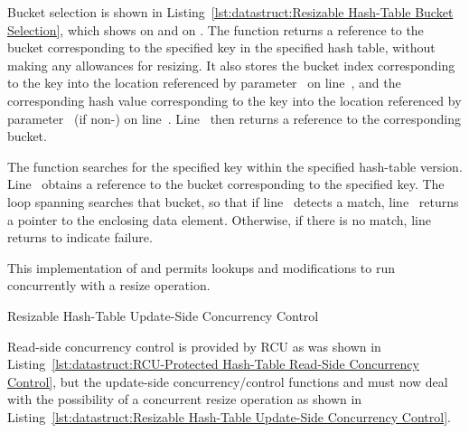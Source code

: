 \begin{fcvref}
Bucket selection is shown in
Listing~\ref{lst:datastruct:Resizable Hash-Table Bucket Selection},
which shows  on
 and  on
.
The  function returns a reference to the bucket
corresponding to the specified key in the specified hash table, without
making any allowances for resizing.
It also stores the bucket index corresponding to the key into the location
referenced by parameter~ on
line~, and the corresponding
hash value corresponding to the key into the location
referenced by parameter~ (if non-) on line~.
Line~ then returns a reference to the corresponding bucket.

The  function searches for the specified key
within the specified hash-table version.
Line~ obtains a reference to the bucket corresponding
to the specified key.
The loop spanning  searches
that bucket, so that if line~ detects a match,
line~ returns a pointer to the enclosing data element.
Otherwise, if there is no match,
line~ returns  to indicate
failure.
\end{fcvref}

\QuickQuizEnd

This implementation of  and 
permits lookups and modifications to run concurrently with a resize
operation.

\begin{listing}[tb]

\caption{Resizable Hash-Table Update-Side Concurrency Control}
\label{lst:datastruct:Resizable Hash-Table Update-Side Concurrency Control}
\end{listing}

Read-side concurrency control is provided by RCU as was shown in
Listing~\ref{lst:datastruct:RCU-Protected Hash-Table Read-Side Concurrency Control},
but the update-side concurrency\-/control functions
 and 
must now deal with the possibility of a
concurrent resize operation as shown in
Listing~\ref{lst:datastruct:Resizable Hash-Table Update-Side Concurrency Control}.

